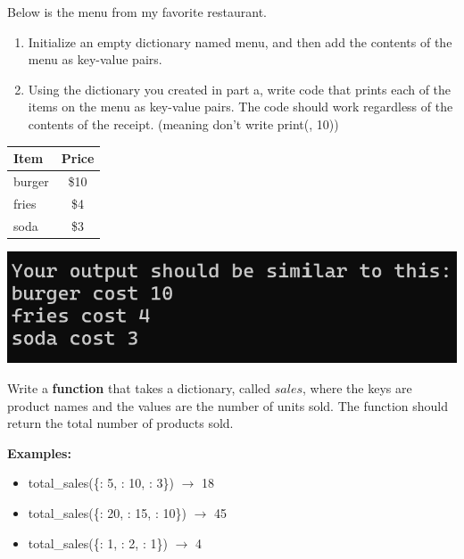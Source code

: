 	\item 	
		Below is the menu from my favorite restaurant.
		\begin{enumerate}
			\item Initialize an empty dictionary named menu, and then add the contents of 
				the menu as key-value pairs.
			\item Using the dictionary you created in part a, write code that prints 
			each of the items on the menu as key-value pairs.  The code should work 
			regardless of the contents of the receipt. 
			(meaning don't write print(, 10))
		\end{enumerate}		
		\begin{center}
		    \begin{minipage}{.3\textwidth}
		        \begin{tabular}{l|c}
		            \textbf{Item} & \textbf{Price} \\ \hline
		            burger & \$10 \\
		            fries & \$4 \\
		            soda & \$3 \\
		        \end{tabular}
		    \end{minipage}
		    \begin{minipage}{.5\textwidth}
				\includegraphics[scale=0.8]{./imgs/menu_output.png}
		    \end{minipage}
		\end{center}





\item
	Write a \textbf{function} that takes a dictionary, called $sales$, where the keys are product names and the values are the number of units sold. 
	The function should return the total number of products sold.

	\textbf{Examples:}  
	\begin{itemize}  
		\item total\_sales(\{: 5, : 10, : 3\}) $\rightarrow$ 18
		\item total\_sales(\{: 20, : 15, : 10\}) $\rightarrow$ 45
		\item total\_sales(\{: 1, : 2, : 1\}) $\rightarrow$ 4
	\end{itemize}



